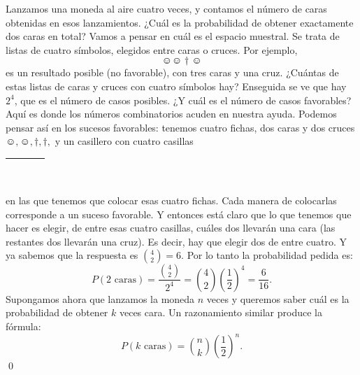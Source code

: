     \begin{Ejemplo}
    \label{cap03:ejem:probabilidadLanzamientoMonedas}
    Lanzamos una moneda al aire cuatro veces, y contamos el número de caras obtenidas en esos lanzamientos. ¿Cuál es la probabilidad de obtener exactamente dos caras en total? Vamos a pensar en cuál es el espacio muestral. Se trata de listas de cuatro símbolos, elegidos entre caras o cruces. Por ejemplo,
    \[\smiley\smiley\dagger\smiley\]
    es un resultado posible (no favorable), con tres caras y una cruz. ¿Cuántas de estas listas de caras y cruces con cuatro símbolos hay? Enseguida se ve que hay $2^4$, que es el número de casos posibles. ¿Y cuál es el número de casos favorables? Aquí es donde los números combinatorios acuden en nuestra ayuda. Podemos pensar así en los sucesos favorables: tenemos cuatro fichas, dos caras y dos cruces $\smiley,\smiley,\dagger,\dagger,$ y un casillero con cuatro casillas\\
    \begin{center}
    \begin{tabular}{|c|c|c|c|}
    \hline
     \rule{0cm}{0.5cm}\rule{1cm}{0cm}&\rule{1cm}{0cm}&\rule{1cm}{0cm} &\rule{1cm}{0cm}\\
     \hline
     \end{tabular}
     \end{center}
     en las que tenemos que colocar esas cuatro fichas. Cada manera de colocarlas corresponde a un suceso favorable. Y entonces está claro que lo que tenemos que hacer es elegir, de entre esas cuatro casillas, cuáles dos llevarán una cara (las restantes dos llevarán una cruz). Es decir, hay que elegir dos de entre cuatro. Y ya sabemos que la respuesta es $\binom{4}{2}=6$. Por lo tanto la probabilidad pedida es:
     \[P(2 \mbox{ caras} )=\dfrac{\binom{4}{2}}{2^4}=\binom{4}{2}\left(\dfrac{1}{2}\right)^4=\dfrac{6}{16}.\]
     Supongamos ahora que lanzamos la moneda $n$ veces y queremos saber cuál es la probabilidad de obtener $k$ veces cara. Un razonamiento similar produce la fórmula:
    \[P(k \mbox{ caras})=\binom{n}{k}\left(\dfrac{1}{2}\right)^n.\]
    \qed
    \end{Ejemplo}

